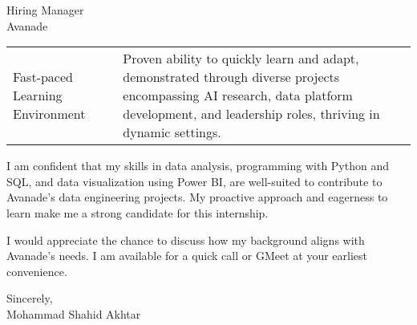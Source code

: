 \documentclass[11pt]{letter}
\begin{document}
\begin{letter}{Hiring Manager\\
Avanade\\
 [Redacted due to privacy]}
{\begin{tabularx}{\textwidth}{@{}p{}X@{}}
Fast-paced Learning Environment & Proven ability to quickly learn and adapt, demonstrated through diverse projects encompassing AI research, data platform development, and leadership roles, thriving in dynamic settings. \\

\end{tabularx}
}

\vspace{0.4cm}
I am confident that my skills in data analysis, programming with Python and SQL, and data visualization using Power BI, are well-suited to contribute to Avanade's data engineering projects. My proactive approach and eagerness to learn make me a strong candidate for this internship.

\vspace{0.4cm}
I would appreciate the chance to discuss how my background aligns with Avanade's needs. I am available for a quick call or GMeet at your earliest convenience.

\vspace{0.4cm}
\begin{flushleft}
Sincerely,\\
[1.5ex]
Mohammad Shahid Akhtar
\end{flushleft}

\end{letter}
\end{document}
